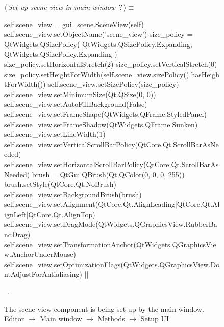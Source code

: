 \documentclass[%
    a4paper,    %
    justified,  %
    nobib,      %
    openany     %
]{tufte-book}
\makeatletter
\renewcommand{\label}[1]{\@tufte@label{##1}}%
\makeatother
\begin{document}
\begin{figure}
\begin{flushleft} \small
\begin{minipage}{\linewidth}\label{scrap83}\raggedright\small
{} $\langle\,${\itshape Set up scene view in main window}\nobreak\ {\footnotesize {?}}$\,\rangle\equiv$
\vspace{-1ex}
\begin{pythoncode}
self.scene_view = gui_scene.SceneView(self)
self.scene_view.setObjectName('scene_view')
size_policy = QtWidgets.QSizePolicy(
    QtWidgets.QSizePolicy.Expanding,
    QtWidgets.QSizePolicy.Expanding
)
size_policy.setHorizontalStretch(2)
size_policy.setVerticalStretch(0)
size_policy.setHeightForWidth(self.scene_view.sizePolicy().hasHeightForWidth())
self.scene_view.setSizePolicy(size_policy)
self.scene_view.setMinimumSize(Qt.QSize(0, 0))
self.scene_view.setAutoFillBackground(False)
self.scene_view.setFrameShape(QtWidgets.QFrame.StyledPanel)
self.scene_view.setFrameShadow(QtWidgets.QFrame.Sunken)
self.scene_view.setLineWidth(1)
self.scene_view.setVerticalScrollBarPolicy(QtCore.Qt.ScrollBarAsNeeded)
self.scene_view.setHorizontalScrollBarPolicy(QtCore.Qt.ScrollBarAsNeeded)
brush = QtGui.QBrush(Qt.QColor(0, 0, 0, 255))
brush.setStyle(QtCore.Qt.NoBrush)
self.scene_view.setBackgroundBrush(brush)
self.scene_view.setAlignment(QtCore.Qt.AlignLeading|QtCore.Qt.AlignLeft|QtCore.Qt.AlignTop)
self.scene_view.setDragMode(QtWidgets.QGraphicsView.RubberBandDrag)
self.scene_view.setTransformationAnchor(QtWidgets.QGraphicsView.AnchorUnderMouse)
self.scene_view.setOptimizationFlags(QtWidgets.QGraphicsView.DontAdjustForAntialiasing)
|\NWsep|
\end{pythoncode}
\vspace{1.5ex}
\footnotesize
\begin{list}{}{\setlength{\itemsep}{-\parsep}\setlength{\itemindent}{-\leftmargin}}
\item \NWtxtMacroRefIn\ .

\item{}
\end{list}
\end{minipage}\vspace{4ex}
\end{flushleft}
\caption{The scene view component is being set up by the main window.
  \newline{}\newline{}Editor $\rightarrow$ Main window $\rightarrow$
  Methods $\rightarrow$ Setup UI}
\label{editor:lst:main-window:methods:setup-ui:setup-scene-view}
\end{figure}
\end{document}
